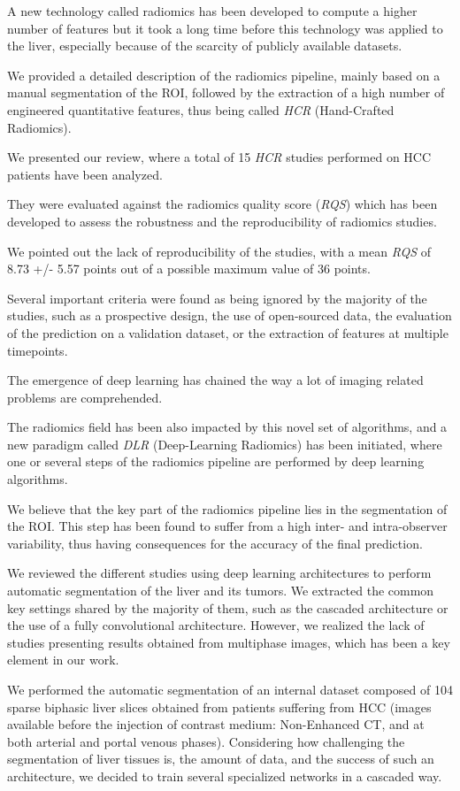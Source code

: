 A new technology called radiomics has been developed to compute a higher
number of features but it took a long time before this technology was
applied to the liver, especially because of the scarcity of publicly
available datasets.

We provided a detailed description of the radiomics pipeline, mainly
based on a manual segmentation of the ROI, followed by the extraction of
a high number of engineered quantitative features, thus being called
\emph{HCR} (Hand-Crafted Radiomics).

We presented our review, where a total of 15 \emph{HCR} studies
performed on HCC patients have been analyzed.

They were evaluated against the radiomics quality score (\emph{RQS})
which has been developed to assess the robustness and the
reproducibility of radiomics studies.

We pointed out the lack of reproducibility of the studies, with a mean
\emph{RQS} of 8.73 +/- 5.57 points out of a possible maximum value of 36
points.

Several important criteria were found as being ignored by the majority
of the studies, such as a prospective design, the use of open-sourced
data, the evaluation of the prediction on a validation dataset, or the
extraction of features at multiple timepoints.

The emergence of deep learning has chained the way a lot of imaging
related problems are comprehended.

The radiomics field has been also impacted by this novel set of
algorithms, and a new paradigm called \emph{DLR} (Deep-Learning
Radiomics) has been initiated, where one or several steps of the
radiomics pipeline are performed by deep learning algorithms.

We believe that the key part of the radiomics pipeline lies in the
segmentation of the ROI. This step has been found to suffer from a high
inter- and intra-observer variability, thus having consequences for the
accuracy of the final prediction.

We reviewed the different studies using deep learning architectures to
perform automatic segmentation of the liver and its tumors. We extracted
the common key settings shared by the majority of them, such as the
cascaded architecture or the use of a fully convolutional architecture.
However, we realized the lack of studies presenting results obtained
from multiphase images, which has been a key element in our work.

We performed the automatic segmentation of an internal dataset composed
of 104 sparse biphasic liver slices obtained from patients suffering
from HCC (images available before the injection of contrast medium:
Non-Enhanced CT, and at both arterial and portal venous phases).
Considering how challenging the segmentation of liver tissues is, the
amount of data, and the success of such an architecture, we decided to
train several specialized networks in a cascaded way.

